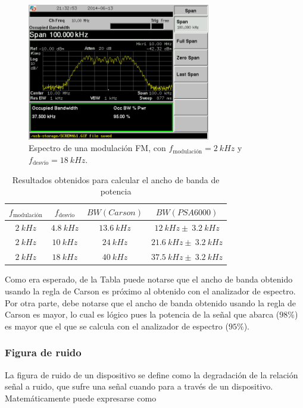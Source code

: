 \documentclass[a4paper,10pt]{article}
\begin{document}
		\begin{figure}[!htb]
			\centering
			\includegraphics[width=8cm]
			{Imagenes/SCREN462.png}
			\caption{Espectro de una modulaci\'on FM, con $
			f_{\mbox{modulaci\'on}}=2~kHz$ y $f_{\mbox{desv\'io}}=18~kHz$.}
			\label{FM18} 
		\end{figure}
		
		\begin{table}[!htp]
			\centering
			\begin{tabular}{|c|c|c|c|}
				\hline
				$f_{\mbox{modulaci\'on}}$ & $f_{\mbox{desv\'io}}$ & $BW(Carson)$
				& $BW(PSA 6000)$ \\
				\hline
				$2~kHz$ & $4.8~kHz$& $13.6~kHz$ & $12~kHz\pm~3.2~kHz$ \\
				\hline
				$2~kHz$ & $10~kHz$& $24~kHz$ & $21.6~kHz\pm~3.2~kHz$ \\
				\hline
				$2~kHz$ & $18~kHz$& $40~kHz$ & $37.5~kHz\pm~3.2~kHz$ \\
				\hline						
			\end{tabular}
			\caption{Resultados obtenidos para calcular el ancho de banda de 
			potencia} \label{carson}
		\end{table}	
		
		\indent Como era  esperado, de la Tabla puede notarse  que el ancho de 
		banda obtenido usando la regla de Carson es pr\'oximo al obtenido con el
		analizador de espectro. Por otra parte, debe notarse que el ancho de 
		banda obtenido usando la regla de Carson es mayor, lo cual es l\'ogico 
		pues la potencia de la se\~nal que abarca ($98\%$) es mayor que el que 
		se calcula con el analizador de espectro ($95\%$).
		
		\subsubsection{Figura de ruido}
		\indent La figura de ruido de un dispositivo se define como la 
		degradaci\'on de la relaci\'on se\~nal a ruido, que sufre una se\~nal 
		cuando para a trav\'es de un dispositivo. Matem\'aticamente puede 
		expresarse como 
		
\end{document}
